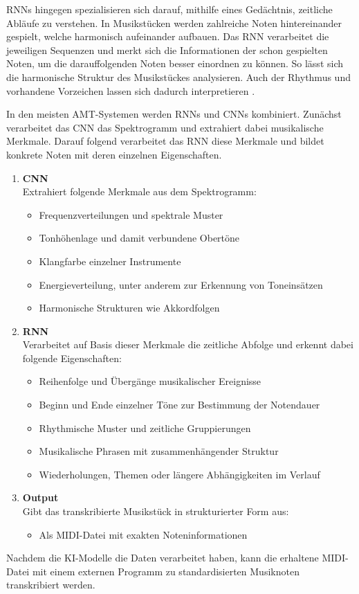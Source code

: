 RNNs hingegen spezialisieren sich darauf, mithilfe eines Gedächtnis, zeitliche Abläufe zu verstehen.
In Musikstücken werden zahlreiche Noten hintereinander gespielt, welche harmonisch aufeinander aufbauen.
Das RNN verarbeitet die jeweiligen Sequenzen und merkt sich die Informationen der schon gespielten Noten,
um die darauffolgenden Noten besser einordnen zu können.
So lässt sich die harmonische Struktur des Musikstückes analysieren.
Auch der Rhythmus und vorhandene Vorzeichen lassen sich dadurch interpretieren \cite{Boeck2012}.

In den meisten AMT-Systemen werden RNNs und CNNs kombiniert.
Zunächst verarbeitet das CNN das Spektrogramm und extrahiert dabei musikalische Merkmale.
Darauf folgend verarbeitet das RNN diese Merkmale und bildet konkrete Noten mit deren einzelnen Eigenschaften.
\begin{enumerate}
    \item \textbf{CNN}\\
    Extrahiert folgende Merkmale aus dem Spektrogramm:
    \begin{itemize}
        \item Frequenzverteilungen und spektrale Muster
        \item Tonhöhenlage und damit verbundene Obertöne
        \item Klangfarbe einzelner Instrumente
        \item Energieverteilung, unter anderem zur Erkennung von Toneinsätzen
        \item Harmonische Strukturen wie Akkordfolgen
    \end{itemize}

    \item \textbf{RNN}\\
    Verarbeitet auf Basis dieser Merkmale die zeitliche Abfolge und erkennt dabei folgende Eigenschaften:
    \begin{itemize}
        \item Reihenfolge und Übergänge musikalischer Ereignisse
        \item Beginn und Ende einzelner Töne zur Bestimmung der Notendauer
        \item Rhythmische Muster und zeitliche Gruppierungen
        \item Musikalische Phrasen mit zusammenhängender Struktur
        \item Wiederholungen, Themen oder längere Abhängigkeiten im Verlauf
    \end{itemize}

    \item \textbf{Output} \\
    Gibt das transkribierte Musikstück in strukturierter Form aus:
    \begin{itemize}
        \item Als MIDI-Datei mit exakten Noteninformationen
    \end{itemize}
\end{enumerate}
Nachdem die KI-Modelle die Daten verarbeitet haben, kann die erhaltene MIDI-Datei mit einem externen Programm
zu standardisierten Musiknoten transkribiert werden.

